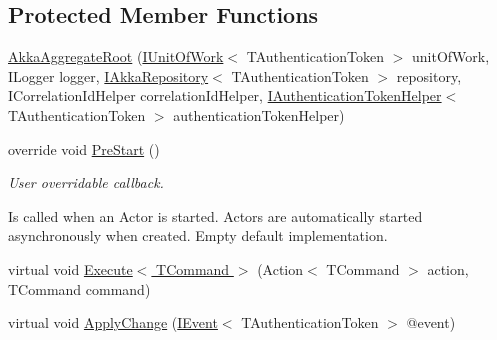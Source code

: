 \subsection*{Protected Member Functions}
\begin{DoxyCompactItemize}
\item 
\hyperlink{classCqrs_1_1Akka_1_1Domain_1_1AkkaAggregateRoot_a13b608db9231f1860a39fb5f43f485ba}{Akka\+Aggregate\+Root} (\hyperlink{interfaceCqrs_1_1Domain_1_1IUnitOfWork}{I\+Unit\+Of\+Work}$<$ T\+Authentication\+Token $>$ unit\+Of\+Work, I\+Logger logger, \hyperlink{interfaceCqrs_1_1Akka_1_1Domain_1_1IAkkaRepository}{I\+Akka\+Repository}$<$ T\+Authentication\+Token $>$ repository, I\+Correlation\+Id\+Helper correlation\+Id\+Helper, \hyperlink{interfaceCqrs_1_1Authentication_1_1IAuthenticationTokenHelper}{I\+Authentication\+Token\+Helper}$<$ T\+Authentication\+Token $>$ authentication\+Token\+Helper)
\item 
override void \hyperlink{classCqrs_1_1Akka_1_1Domain_1_1AkkaAggregateRoot_a7da2d3a244e34717ec5af1db8f0042bc}{Pre\+Start} ()
\begin{DoxyCompactList}\small\item\em User overridable callback. 

Is called when an Actor is started. Actors are automatically started asynchronously when created. Empty default implementation. \end{DoxyCompactList}\item 
virtual void \hyperlink{classCqrs_1_1Akka_1_1Domain_1_1AkkaAggregateRoot_af8a9bd0e80498b3b54beb7cbec820533}{Execute$<$ T\+Command $>$} (Action$<$ T\+Command $>$ action, T\+Command command)
\item 
virtual void \hyperlink{classCqrs_1_1Akka_1_1Domain_1_1AkkaAggregateRoot_aaa135cb26be9e5353986f5611f05c059}{Apply\+Change} (\hyperlink{interfaceCqrs_1_1Events_1_1IEvent}{I\+Event}$<$ T\+Authentication\+Token $>$ @event)
\end{DoxyCompactItemize}
